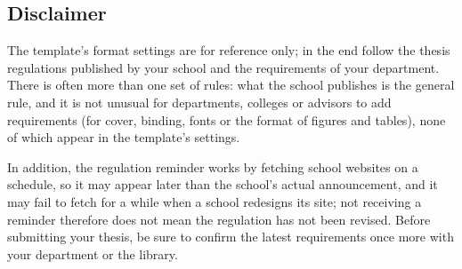 \subsection{Disclaimer}

The template's format settings are for reference only; in the end follow the thesis regulations published by your school and the requirements of your department. There is often more than one set of rules: what the school publishes is the general rule, and it is not unusual for departments, colleges or advisors to add requirements (for cover, binding, fonts or the format of figures and tables), none of which appear in the template's settings.

In addition, the regulation reminder works by fetching school websites on a schedule, so it may appear later than the school's actual announcement, and it may fail to fetch for a while when a school redesigns its site; not receiving a reminder therefore does not mean the regulation has not been revised. Before submitting your thesis, be sure to confirm the latest requirements once more with your department or the library.
